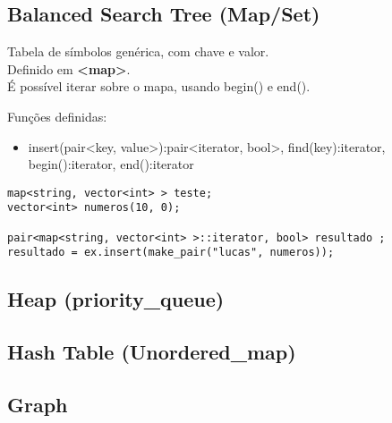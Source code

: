 \documentclass{article}
\begin{document}
\subsection{Balanced Search Tree (Map/Set)}
Tabela de símbolos genérica, com chave e valor.\\
Definido em \textbf{<map>}.\\
É possível iterar sobre o mapa, usando begin() e end().

Funções definidas:

\begin{itemize}
   \item insert(pair<key, value>):pair<iterator, bool>, find(key):iterator, begin():iterator, end():iterator
\end{itemize}

\begin{lstlisting}
map<string, vector<int> > teste;
vector<int> numeros(10, 0);

pair<map<string, vector<int> >::iterator, bool> resultado ;
resultado = ex.insert(make_pair("lucas", numeros));
\end{lstlisting}

\subsection{Heap (priority\_queue)}

\subsection{Hash Table (Unordered\_map)}

\subsection{Graph}
\end{document}
